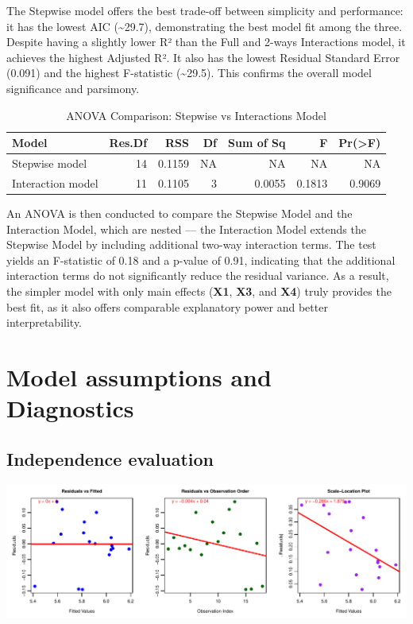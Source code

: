 \documentclass[
  11pt,
]{article}
\begin{document}
The Stepwise model offers the best trade-off between simplicity and
performance: it has the lowest AIC (\textasciitilde29.7), demonstrating
the best model fit among the three. Despite having a slightly lower R²
than the Full and 2-ways Interactions model, it achieves the highest
Adjusted R². It also has the lowest Residual Standard Error (0.091) and
the highest F-statistic (\textasciitilde29.5). This confirms the overall
model significance and parsimony.

\begin{table}[!h]
\centering
\caption{\label{tab:unnamed-chunk-12}ANOVA Comparison: Stepwise vs Interactions Model}
\centering
\fontsize{8}{10}\selectfont
\begin{tabular}[t]{lrrrrrr}
\toprule
Model & Res.Df & RSS & Df & Sum of Sq & F & Pr(>F)\\
\midrule
Stepwise model & 14 & 0.1159 & NA & NA & NA & NA\\
Interaction model & 11 & 0.1105 & 3 & 0.0055 & 0.1813 & 0.9069\\
\bottomrule
\end{tabular}
\end{table}

An ANOVA is then conducted to compare the Stepwise Model and the
Interaction Model, which are nested --- the Interaction Model extends
the Stepwise Model by including additional two-way interaction terms.
The test yields an F-statistic of 0.18 and a p-value of 0.91, indicating
that the additional interaction terms do not significantly reduce the
residual variance. As a result, the simpler model with only main effects
(\textbf{X1}, \textbf{X3}, and \textbf{X4}) truly provides the best fit,
as it also offers comparable explanatory power and better
interpretability.

\section{Model assumptions and
Diagnostics}\label{model-assumptions-and-diagnostics}

\subsection{Independence evaluation}\label{independence-evaluation}

\includegraphics{Figs/unnamed-chunk-13-1.pdf}
\end{document}
